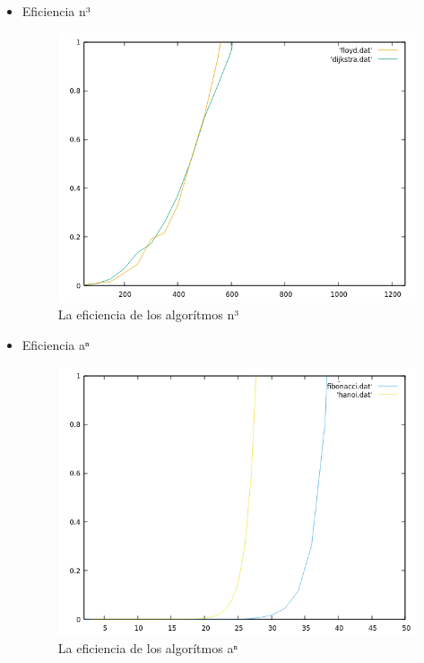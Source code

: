 \documentclass[12pt, spanish]{article}
\begin{document}
\begin{itemize}
  \item Eficiencia n³
    \begin{figure}[H]
    \centering
    \includegraphics[scale = 0.7]{FloydDijkstra.png}
    \caption{La eficiencia de los algorítmos n³}
  \end{figure}

  \item Eficiencia aⁿ
    \begin{figure}[H]
    \centering
    \includegraphics[scale = 0.7]{FibonacciHanoi.png}
    \caption{La eficiencia de los algorítmos aⁿ}
  \end{figure}

\end{itemize}

\vspace{5cm}
 
 
\end{document}
